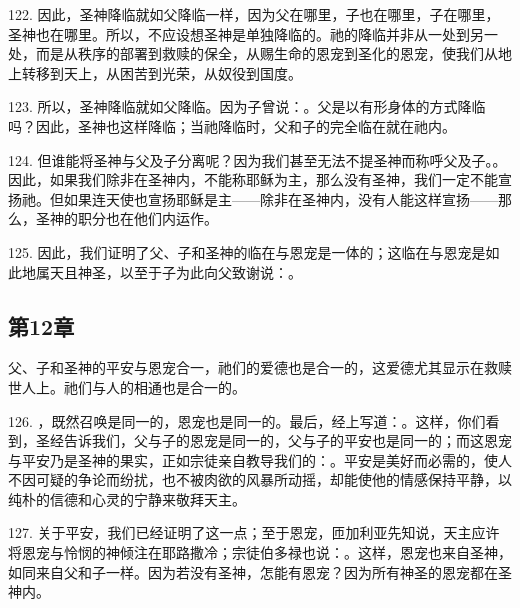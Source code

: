122. 因此，圣神降临就如父降临一样，因为父在哪里，子也在哪里，子在哪里，圣神也在哪里。所以，不应设想圣神是单独降临的。祂的降临并非从一处到另一处，而是从秩序的部署到救赎的保全，从赐生命的恩宠到圣化的恩宠，使我们从地上转移到天上，从困苦到光荣，从奴役到国度。\par

123. 所以，圣神降临就如父降临。因为子曾说：。父是以有形身体的方式降临吗？因此，圣神也这样降临；当祂降临时，父和子的完全临在就在祂内。\par

124. 但谁能将圣神与父及子分离呢？因为我们甚至无法不提圣神而称呼父及子。。因此，如果我们除非在圣神内，不能称耶稣为主，那么没有圣神，我们一定不能宣扬祂。但如果连天使也宣扬耶稣是主——除非在圣神内，没有人能这样宣扬——那么，圣神的职分也在他们内运作。\par

125. 因此，我们证明了父、子和圣神的临在与恩宠是一体的；这临在与恩宠是如此地属天且神圣，以至于子为此向父致谢说：。\par


\subsection{第12章}

父、子和圣神的平安与恩宠合一，祂们的爱德也是合一的，这爱德尤其显示在救赎世人上。祂们与人的相通也是合一的。\par

126. ，既然召唤是同一的，恩宠也是同一的。最后，经上写道：。这样，你们看到，圣经告诉我们，父与子的恩宠是同一的，父与子的平安也是同一的；而这恩宠与平安乃是圣神的果实，正如宗徒亲自教导我们的：。平安是美好而必需的，使人不因可疑的争论而纷扰，也不被肉欲的风暴所动摇，却能使他的情感保持平静，以纯朴的信德和心灵的宁静来敬拜天主。\par

127. 关于平安，我们已经证明了这一点；至于恩宠，匝加利亚先知说，天主应许将恩宠与怜悯的神倾注在耶路撒冷；宗徒伯多禄也说：。这样，恩宠也来自圣神，如同来自父和子一样。因为若没有圣神，怎能有恩宠？因为所有神圣的恩宠都在圣神内。\par

